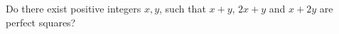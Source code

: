 Do there exist positive integers $x, y$, such that $x + y$, $2x + y$ and $x + 2y$ are perfect squares?
